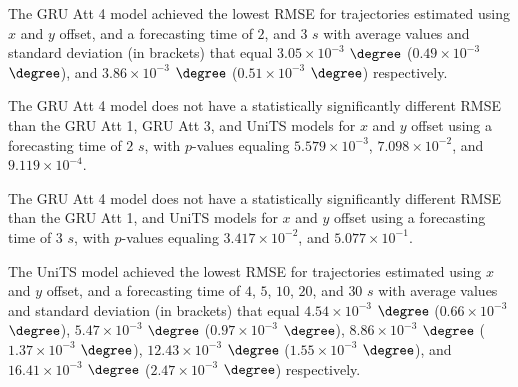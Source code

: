 \begin{table}[!ht]
	\centering
	\caption{The average RMSE in $\degree$ ($\times 10^{-3}$), with standard deviation in brackets, across $k$-fold validation datasets for the trajectories in the $k$-fold testing datasets estimated using $x$ and $y$ offset, different RNN models, and forecasting times.}
	\label{tab:best_no_abs_RMSE}
\end{table}

The GRU Att 4 model achieved the lowest RMSE for trajectories estimated using $x$ and $y$ offset, and a forecasting time of $2$, and $3$ $s$ with average values and standard deviation (in brackets) that equal $3.05 \times 10^{-3}$ $\degree$ ($0.49 \times 10^{-3}$ $\degree$), and $3.86 \times 10^{-3}$ $\degree$ ($0.51 \times 10^{-3}$ $\degree$) respectively.

The GRU Att 4 model does not have a statistically significantly different RMSE than the GRU Att 1, GRU Att 3, and UniTS models for $x$ and $y$ offset using a forecasting time of $2$ $s$, with $p$-values equaling $5.579 \times 10^{-3}$, $7.098 \times 10^{-2}$, and $9.119 \times 10^{-4}$.

The GRU Att 4 model does not have a statistically significantly different RMSE than the GRU Att 1, and UniTS models for $x$ and $y$ offset using a forecasting time of $3$ $s$, with $p$-values equaling $3.417 \times 10^{-2}$, and $5.077 \times 10^{-1}$.

The UniTS model achieved the lowest RMSE for trajectories estimated using $x$ and $y$ offset, and a forecasting time of $4$, $5$, $10$, $20$, and $30$ $s$ with average values and standard deviation (in brackets) that equal $4.54 \times 10^{-3}$ $\degree$ ($0.66 \times 10^{-3}$ $\degree$), $5.47 \times 10^{-3}$ $\degree$ ($0.97 \times 10^{-3}$ $\degree$), $8.86 \times 10^{-3}$ $\degree$ ($1.37 \times 10^{-3}$ $\degree$), $12.43 \times 10^{-3}$ $\degree$ ($1.55 \times 10^{-3}$ $\degree$), and $16.41 \times 10^{-3}$ $\degree$ ($2.47 \times 10^{-3}$ $\degree$) respectively.

